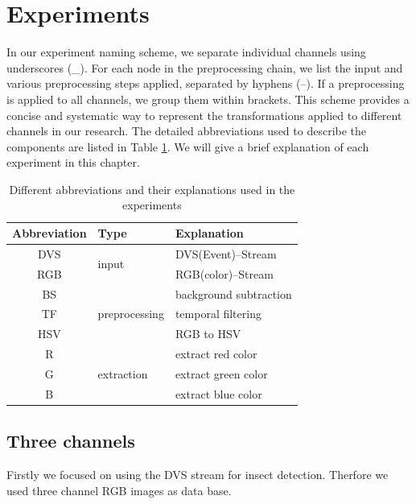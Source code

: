 \documentclass[sigchi,screen]{acmart}
\begin{document}
\section{Experiments}
\label{ch:experiments}
In our experiment naming scheme, we separate individual channels using underscores (\_). For each node in the preprocessing chain, we list the input and various preprocessing steps applied, separated by hyphens (--). If a preprocessing is applied to all channels, we group them within brackets. This scheme provides a concise and systematic way to represent the transformations applied to different channels in our research. The detailed abbreviations used to describe the components are listed in Table \ref{tbl:abbrs}. We will give a brief explanation of each experiment in this chapter.

\begin{table}[htb]
    \centering
    \begin{tabular}{c|l|l} 
        \textbf{Abbreviation} & \textbf{Type}          & \textbf{Explanation}        \\ 
        \hline
        DVS & \multirow{2}{*}{input} & DVS(Event)--Stream  \\
        RGB                      &                        & RGB(color)--Stream  \\ 
        \hline
        BS  & \multirow{3}{*}{preprocessing} & background subtraction  \\
        TF                      &                                  & temporal filtering \\
        HSV                      &                                  & RGB to HSV \\
        \hline
        R & \multirow{3}{*}{extraction} & extract red color \\
        G                    &                                & extract green color \\
        B                    &                                & extract blue color  \\
    \end{tabular}
    \caption{Different abbreviations and their explanations used in the experiments}
    \label{tbl:abbrs}
\end{table}
\subsection{Three channels}
Firstly we focused on using the DVS stream for insect detection. Therfore we used three channel RGB images as data base.
\label{ch:experiment-three}
\end{document}

